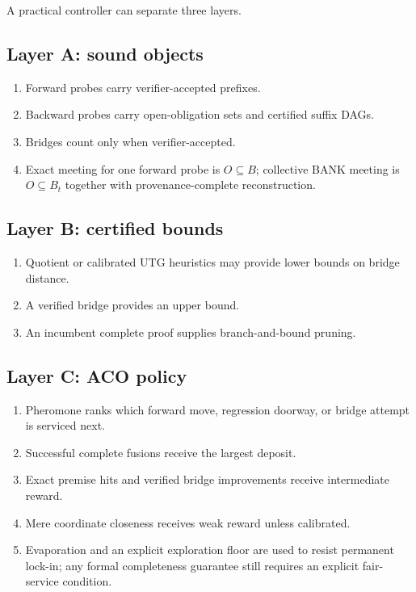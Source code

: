 \documentclass[11pt]{article}
\begin{document}
A practical controller can separate three layers.

\subsection*{Layer A: sound objects}
\begin{enumerate}[nosep]
\item Forward probes carry verifier-accepted prefixes.
\item Backward probes carry open-obligation sets and certified suffix DAGs.
\item Bridges count only when verifier-accepted.
\item Exact meeting for one forward probe is $O\subseteq B$; collective BANK meeting is $O\subseteq B_t$ together with provenance-complete reconstruction.
\end{enumerate}

\subsection*{Layer B: certified bounds}
\begin{enumerate}[nosep]
\item Quotient or calibrated UTG heuristics may provide lower bounds on bridge distance.
\item A verified bridge provides an upper bound.
\item An incumbent complete proof supplies branch-and-bound pruning.
\end{enumerate}

\subsection*{Layer C: ACO policy}
\begin{enumerate}[nosep]
\item Pheromone ranks which forward move, regression doorway, or bridge attempt is serviced next.
\item Successful complete fusions receive the largest deposit.
\item Exact premise hits and verified bridge improvements receive intermediate reward.
\item Mere coordinate closeness receives weak reward unless calibrated.
\item Evaporation and an explicit exploration floor are used to resist permanent lock-in; any formal completeness guarantee still requires an explicit fair-service condition.
\end{enumerate}
\end{document}

